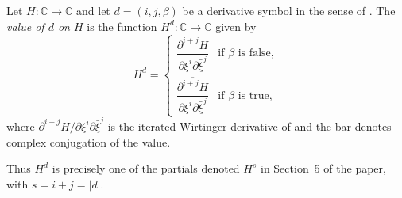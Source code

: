 \begin{definition}
Let $H\colon\mathbb{C}\to\mathbb{C}$ and let $d=(i,j,\beta)$ be a derivative
symbol in the sense of .  The \emph{value of $d$ on $H$}
is the function $H^d\colon\mathbb{C}\to\mathbb{C}$ given by
\[
  H^d=\begin{cases}
    \dfrac{\partial^{i+j}H}{\partial\xi^i\partial\bar\xi^j}
      &\text{if }\beta\text{ is false},\\[2.5ex]
    \overline{\dfrac{\partial^{i+j}H}{\partial\xi^i\partial\bar\xi^j}}
      &\text{if }\beta\text{ is true},
  \end{cases}
\]
where $\partial^{i+j}H/\partial\xi^i\partial\bar\xi^j$ is the iterated
Wirtinger derivative of  and the bar denotes complex
conjugation of the value.

Thus $H^d$ is precisely one of the partials denoted $H^s$ in Section~5 of the
paper, with $s=i+j=|d|$.
\end{definition}
